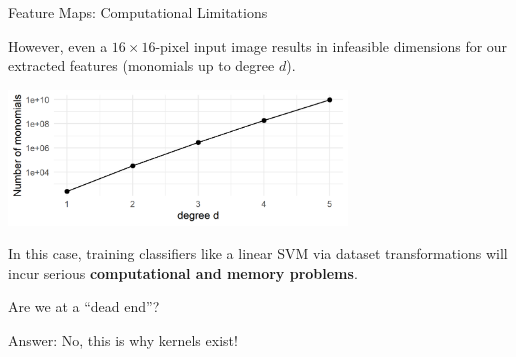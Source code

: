 \documentclass[11pt,compress,t,notes=noshow, xcolor=table]{beamer}
\begin{document}
\begin{vbframe}{Feature Maps: Computational Limitations}
\begin{footnotesize}
\end{footnotesize}

\framebreak

However, even a $16 \times 16$-pixel input image results in infeasible dimensions for our extracted features (monomials up to degree $d$).

\begin{center}
\includegraphics[width = 9cm ]{figure/n_monomials.png}
\end{center}

In this case, training classifiers like a linear SVM via dataset transformations will incur serious \textbf{computational and memory problems}.

\vspace*{0.2cm} 

Are we at a \enquote{dead end}?

Answer: No, this is why kernels exist!

\end{vbframe}

\endlecture
\end{document}

